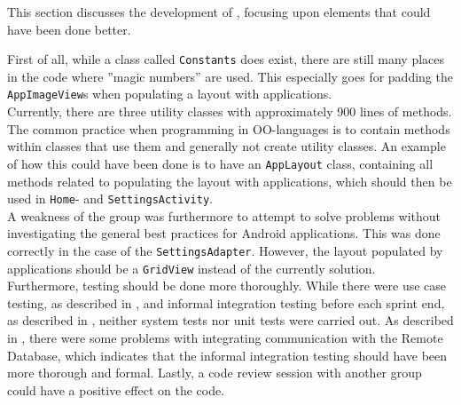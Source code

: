 This section discusses the development of \launcher, focusing upon elements that could have been done better.

First of all, while a class called \lstinline|Constants| does exist, there are still many places in the code where ''magic numbers'' are used.
This especially goes for padding the \lstinline|AppImageView|s when populating a layout with applications.\\

Currently, there are three utility classes with approximately 900 lines of methods. 
The common practice when programming in OO-languages is to contain methods within classes that use them and generally not create utility classes.
An example of how this could have been done is to have an \lstinline|AppLayout| class, containing all methods related to populating the layout with applications, which should then be used in \lstinline|Home|- and \lstinline|SettingsActivity|.\\

A weakness of the group was furthermore to attempt to solve problems without investigating the general best practices for Android applications.
This was done correctly in the case of the \lstinline|SettingsAdapter|.
However, the layout populated by applications should be a \lstinline|GridView| instead of the currently solution.\\

Furthermore, testing should be done more thoroughly.
While there were use case testing, as described in , and informal integration testing before each sprint end, as described in , neither system tests nor unit tests were carried out.
As described in , there were some problems with integrating communication with the Remote Database, which indicates that the informal integration testing should have been more thorough and formal.
Lastly, a code review session with another group could have a positive effect on the code.
